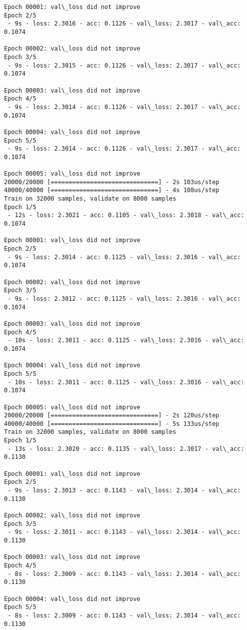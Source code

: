 \documentclass[11pt]{article}
\begin{document}
\begin{Verbatim}[commandchars=\\\{\}]
Epoch 00001: val\_loss did not improve
Epoch 2/5
 - 9s - loss: 2.3016 - acc: 0.1126 - val\_loss: 2.3017 - val\_acc: 0.1074

Epoch 00002: val\_loss did not improve
Epoch 3/5
 - 9s - loss: 2.3015 - acc: 0.1126 - val\_loss: 2.3017 - val\_acc: 0.1074

Epoch 00003: val\_loss did not improve
Epoch 4/5
 - 9s - loss: 2.3014 - acc: 0.1126 - val\_loss: 2.3017 - val\_acc: 0.1074

Epoch 00004: val\_loss did not improve
Epoch 5/5
 - 9s - loss: 2.3014 - acc: 0.1126 - val\_loss: 2.3017 - val\_acc: 0.1074

Epoch 00005: val\_loss did not improve
20000/20000 [==============================] - 2s 103us/step
40000/40000 [==============================] - 4s 108us/step
Train on 32000 samples, validate on 8000 samples
Epoch 1/5
 - 12s - loss: 2.3021 - acc: 0.1105 - val\_loss: 2.3018 - val\_acc: 0.1074

Epoch 00001: val\_loss did not improve
Epoch 2/5
 - 9s - loss: 2.3014 - acc: 0.1125 - val\_loss: 2.3016 - val\_acc: 0.1074

Epoch 00002: val\_loss did not improve
Epoch 3/5
 - 9s - loss: 2.3012 - acc: 0.1125 - val\_loss: 2.3016 - val\_acc: 0.1074

Epoch 00003: val\_loss did not improve
Epoch 4/5
 - 10s - loss: 2.3011 - acc: 0.1125 - val\_loss: 2.3016 - val\_acc: 0.1074

Epoch 00004: val\_loss did not improve
Epoch 5/5
 - 10s - loss: 2.3011 - acc: 0.1125 - val\_loss: 2.3016 - val\_acc: 0.1074

Epoch 00005: val\_loss did not improve
20000/20000 [==============================] - 2s 120us/step
40000/40000 [==============================] - 5s 133us/step
Train on 32000 samples, validate on 8000 samples
Epoch 1/5
 - 13s - loss: 2.3020 - acc: 0.1135 - val\_loss: 2.3017 - val\_acc: 0.1130

Epoch 00001: val\_loss did not improve
Epoch 2/5
 - 9s - loss: 2.3013 - acc: 0.1143 - val\_loss: 2.3014 - val\_acc: 0.1130

Epoch 00002: val\_loss did not improve
Epoch 3/5
 - 9s - loss: 2.3011 - acc: 0.1143 - val\_loss: 2.3014 - val\_acc: 0.1130

Epoch 00003: val\_loss did not improve
Epoch 4/5
 - 8s - loss: 2.3009 - acc: 0.1143 - val\_loss: 2.3014 - val\_acc: 0.1130

Epoch 00004: val\_loss did not improve
Epoch 5/5
 - 8s - loss: 2.3009 - acc: 0.1143 - val\_loss: 2.3014 - val\_acc: 0.1130


\end{Verbatim}
\end{document}
